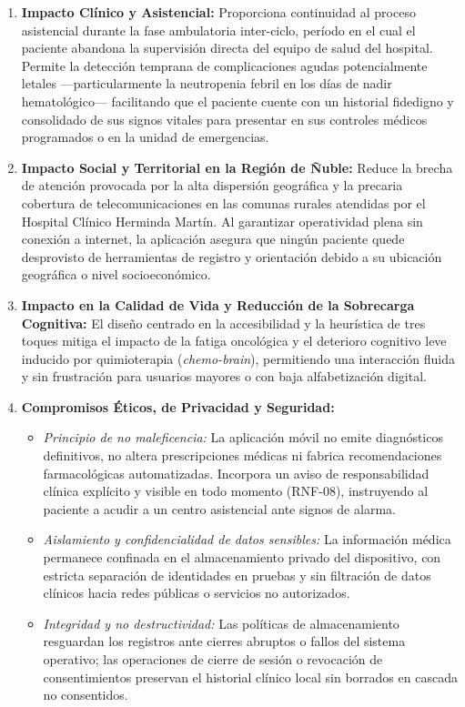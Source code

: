 \begin{enumerate}
    \item \textbf{Impacto Clínico y Asistencial:} Proporciona continuidad al proceso asistencial durante la fase ambulatoria inter-ciclo, período en el cual el paciente abandona la supervisión directa del equipo de salud del hospital. Permite la detección temprana de complicaciones agudas potencialmente letales —particularmente la neutropenia febril en los días de nadir hematológico— facilitando que el paciente cuente con un historial fidedigno y consolidado de sus signos vitales para presentar en sus controles médicos programados o en la unidad de emergencias.
    \item \textbf{Impacto Social y Territorial en la Región de Ñuble:} Reduce la brecha de atención provocada por la alta dispersión geográfica y la precaria cobertura de telecomunicaciones en las comunas rurales atendidas por el Hospital Clínico Herminda Martín. Al garantizar operatividad plena sin conexión a internet, la aplicación asegura que ningún paciente quede desprovisto de herramientas de registro y orientación debido a su ubicación geográfica o nivel socioeconómico.
    \item \textbf{Impacto en la Calidad de Vida y Reducción de la Sobrecarga Cognitiva:} El diseño centrado en la accesibilidad y la heurística de tres toques mitiga el impacto de la fatiga oncológica y el deterioro cognitivo leve inducido por quimioterapia (\textit{chemo-brain}), permitiendo una interacción fluida y sin frustración para usuarios mayores o con baja alfabetización digital.
    \item \textbf{Compromisos Éticos, de Privacidad y Seguridad:}
    \begin{itemize}
        \item \textit{Principio de no maleficencia:} La aplicación móvil no emite diagnósticos definitivos, no altera prescripciones médicas ni fabrica recomendaciones farmacológicas automatizadas. Incorpora un aviso de responsabilidad clínica explícito y visible en todo momento (RNF-08), instruyendo al paciente a acudir a un centro asistencial ante signos de alarma.
        \item \textit{Aislamiento y confidencialidad de datos sensibles:} La información médica permanece confinada en el almacenamiento privado del dispositivo, con estricta separación de identidades en pruebas y sin filtración de datos clínicos hacia redes públicas o servicios no autorizados.
        \item \textit{Integridad y no destructividad:} Las políticas de almacenamiento resguardan los registros ante cierres abruptos o fallos del sistema operativo; las operaciones de cierre de sesión o revocación de consentimientos preservan el historial clínico local sin borrados en cascada no consentidos.
    \end{itemize}
\end{enumerate}

